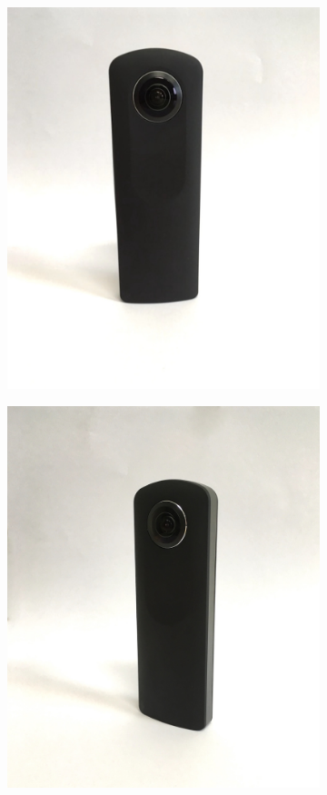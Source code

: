 \begin{figure}[htb]
	\centering
	\begin{subfigure}{0.3\textwidth}
		\centering
		\includegraphics[width=\textwidth]{img/theta1}
	\end{subfigure}
	\begin{subfigure}{0.3\textwidth}
		\centering
		\includegraphics[width=\textwidth]{img/theta2}

\end{subfigure}
\end{figure}
